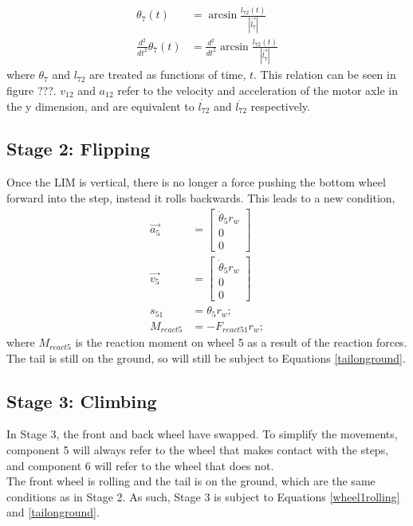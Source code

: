 \begin{subequations}
	\begin{align}
		\theta_7(t) &= \arcsin{\frac{l_{72}(t)}{|\vec{l_7}|}}\\
		\frac{d^2}{dt^2}\theta_7(t) &= \frac{d^2}{dt^2}\arcsin{\frac{l_{72}(t)}{|\vec{l_7}|}}
	\end{align}
\end{subequations}
where $\theta_7$ and $l_{72}$ are treated as functions of time, $t$. This relation can be seen in figure ???. $v_{12}$ and $a_{12}$ refer to the velocity and acceleration of the motor axle in the y dimension, and are equivalent to $\dot{l_{72}}$ and $\ddot{l_{72}}$ respectively.\\

\subsection*{Stage 2: Flipping}

Once the LIM is vertical, there is no longer a force pushing the bottom wheel forward into the step, instead it rolls backwards. This leads to a new condition,
\begin{subequations}
	\label{wheel1rolling}
	\begin{align}
		\vec{a_5} &= \begin{bmatrix}
			\ddot{\theta}_5 r_w \\
			0\\
			0
		\end{bmatrix}\\
		\vec{v_5} &= \begin{bmatrix}
			\dot{\theta}_5 r_w \\
			0\\
			0
		\end{bmatrix}\\
		s_{51} &= \theta_{5} r_w;\\
		M_{react5} &= - F_{react51} r_w;
	\end{align}
\end{subequations}
where $M_{react5}$ is the reaction moment on wheel 5 as a result of the reaction forces.
The tail is still on the ground, so will still be subject to Equations \ref{tailonground}.

\subsection*{Stage 3: Climbing}

In Stage 3, the front and back wheel have swapped. To simplify the movements, component 5 will always refer to the wheel that makes contact with the steps, and component 6 will refer to the wheel that does not. \\
The front wheel is rolling and the tail is on the ground, which are the same conditions as in Stage 2. As such, Stage 3 is subject to Equations \ref{wheel1rolling} and \ref{tailonground}.

